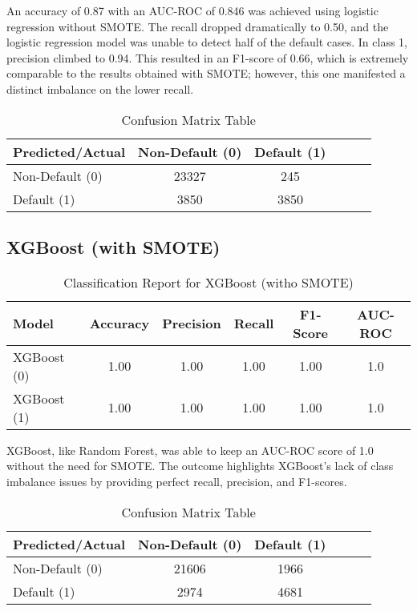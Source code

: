 \documentclass[12pt, a4paper,oneside]{book}
\numberwithin{equation}{section}
\begin{document}
An accuracy of 0.87 with an AUC-ROC of 0.846 was achieved using logistic regression without SMOTE. The recall dropped dramatically to 0.50, and the logistic regression model was unable to detect half of the default cases. In class 1, precision climbed to 0.94. This resulted in an F1-score of 0.66, which is extremely comparable to the results obtained with SMOTE; however, this one manifested a distinct imbalance on the lower recall.
\begin{table}[h!]
\centering
\begin{tabular}{|l|c|c|c|c|c|}
\hline
\textbf{Predicted/Actual} & \textbf{Non-Default (0)} & \textbf{	Default (1)} \\ \hline
Non-Default (0) & 23327& 245 \\ \hline
Default (1) & 	3850 &	3850 \\ \hline
\end{tabular}
\caption{Confusion Matrix Table}
\end{table}


\newpage
\subsection{XGBoost (with SMOTE)}

\begin{table}[h!]
\centering
\begin{tabular}{|l|c|c|c|c|c|}
\hline
\textbf{Model} & \textbf{Accuracy} & \textbf{Precision} & \textbf{Recall} & \textbf{F1-Score} & \textbf{AUC-ROC} \\ \hline
XGBoost  (0)& 1.00 & 1.00 & 1.00 & 1.00 &1.0 \\ \hline
XGBoost (1) & 1.00& 1.00 & 1.00 & 1.00 &1.0 \\ \hline
\end{tabular}
\caption{Classification Report for XGBoost (witho SMOTE)}
\end{table}

XGBoost, like Random Forest, was able to keep an AUC-ROC score of 1.0 without the need for SMOTE. The outcome highlights XGBoost's lack of class imbalance issues by providing perfect recall, precision, and F1-scores.

\begin{table}[h!]
\centering
\begin{tabular}{|l|c|c|c|c|c|}
\hline
\textbf{Predicted/Actual} & \textbf{Non-Default (0)} & \textbf{	Default (1)} \\ \hline
Non-Default (0) & 21606 & 1966  \\ \hline
Default (1) & 2974 & 4681  \\ \hline
\end{tabular}
\caption{Confusion Matrix Table}
\end{table}
\end{document}
